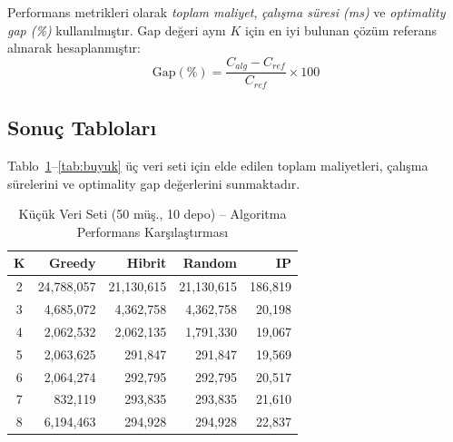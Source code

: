 \documentclass[conference]{IEEEtran}
\begin{document}
Performans metrikleri olarak \textit{toplam maliyet},
\textit{\c{c}al{\i}\c{s}ma s\"{u}resi (ms)} ve
\textit{optimality gap (\%)} kullan{\i}lm{\i}\c{s}t{\i}r.
Gap de\u{g}eri ayn{\i} $K$ i\c{c}in en iyi bulunan \c{c}\"{o}z\"{u}m
referans al{\i}narak hesaplanm{\i}\c{s}t{\i}r:
\begin{equation}
  \text{Gap}(\%) =
    \frac{C_{alg} - C_{ref}}{C_{ref}} \times 100
  \label{eq:gap}
\end{equation}

\subsection{Sonu\c{c} Tablolar{\i}}

Tablo~\ref{tab:kucuk}--\ref{tab:buyuk} \"{u}\c{c} veri seti i\c{c}in
elde edilen toplam maliyetleri, \c{c}al{\i}\c{s}ma s\"{u}relerini ve
optimality gap de\u{g}erlerini sunmaktad{\i}r.

\begin{table}[htbp]
\centering
\caption{K\"{u}\c{c}\"{u}k Veri Seti (50 m\"{u}\c{s}., 10 depo) --
Algoritma Performans Kar\c{s}{\i}la\c{s}t{\i}rmas{\i}}
\label{tab:kucuk}
\begin{tabular}{|c|r|r|r|r|}
\hline
\textbf{K} & \textbf{Greedy} & \textbf{Hibrit} & \textbf{Random} & \textbf{IP} \\
\hline
2 & 24,788,057 & 21,130,615 & 21,130,615 & 186,819 \\
\hline
3 &  4,685,072 &  4,362,758 &  4,362,758 &  20,198 \\
\hline
4 &  2,062,532 &  2,062,135 &  1,791,330 &  19,067 \\
\hline
5 &  2,063,625 &    291,847 &    291,847 &  19,569 \\
\hline
6 &  2,064,274 &    292,795 &    292,795 &  20,517 \\
\hline
7 &    832,119 &    293,835 &    293,835 &  21,610 \\
\hline
8 &  6,194,463 &    294,928 &    294,928 &  22,837 \\
\hline
\end{tabular}
\end{table}
\end{document}
